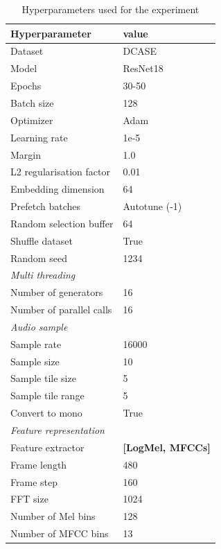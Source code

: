 \documentclass[twocolumn]{article}
\begin{document}
\begin{table}[H]
    \centering
    \caption{Hyperparameters used for the experiment}
	\label{tab:Hyperparameters}
    \begin{tabular}{l|l}
        \toprule
        \textbf{Hyperparameter} & \textbf{value} \\ 
        \midrule[1pt]
        Dataset & DCASE \\
        \hline
        Model & ResNet18 \\ 
        \hline
        Epochs & 30-50 \\ 
        \hline
        Batch size & 128 \\ 
        \hline
        Optimizer & Adam \\ 
        \hline
        Learning rate & 1e-5 \\
        \hline
        Margin & 1.0 \\
        \hline
        L2 regularisation factor & 0.01 \\
        \hline
        Embedding dimension & 64 \\
        \hline
        Prefetch batches & Autotune (-1) \\ 
        \hline
        Random selection buffer & 64 \\ 
        \hline
        Shuffle dataset & True \\
        \hline
        Random seed & 1234 \\
        \midrule[1pt]
        \multicolumn{2}{l}{\textit{Multi threading}} \\
        \midrule[1pt]
        Number of generators & 16 \\ 
        \hline
        Number of parallel calls & 16 \\
        \midrule[1pt]
        \multicolumn{2}{l}{\textit{Audio sample}} \\
        \midrule[1pt]
        Sample rate & 16000 \\ 
        \hline
        Sample size & 10 \\
        \hline
        Sample tile size & 5 \\
        \hline
        Sample tile range & 5 \\
        \hline
        Convert to mono & True \\
        \midrule[1pt]
        \multicolumn{2}{l}{\textit{Feature representation}} \\
        \midrule[1pt]
        Feature extractor & \textbf{[LogMel, MFCCs]} \\ 
        \hline
        Frame length & 480 \\
        \hline
        Frame step & 160 \\
        \hline
        FFT size & 1024 \\
        \hline
        Number of Mel bins & 128 \\
        \hline
        Number of MFCC bins & 13 \\
        \bottomrule
    \end{tabular}
\end{table}
\end{document}
